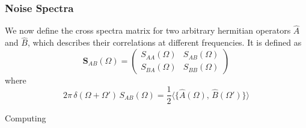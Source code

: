 \subsubsection{Noise Spectra}
We now define the cross spectra matrix for two arbitrary hermitian operators $\hat{A}$ and $\hat{B}$, which describes their correlations at different frequencies. It is defined as 
\begin{equation}
  \mathbf{S}_{AB}(\Omega) = \begin{pmatrix}
  S_{AA}(\Omega) & S_{AB}(\Omega) \\
  S_{BA}(\Omega) & S_{BB}(\Omega) 
  \end{pmatrix}
\end{equation}
where 
\begin{equation}
  2\pi \, \delta(\Omega + \Omega') \, S_{AB}(\Omega) = \frac{1}{2}\langle \{\hat{A}(\Omega),\,\hat{B}(\Omega') \} \rangle
\end{equation}

Computing 

